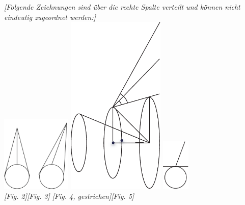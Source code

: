    \clearpage
   \pstart \noindent \textit{[Folgende Zeichnungen sind \"uber die rechte Spalte verteilt und k\"onnen nicht eindeutig zugeordnet werden:]}\\
   \includegraphics[width=0.25\textwidth]{images/35_15_6_65vfig1u2}
   \hspace{10mm}
   \includegraphics[width=0.35\textwidth]{images/35_15_6_65vfig3}
   \hspace{10mm}
   \includegraphics[width=0.1\textwidth]{images/35_15_6_65vfig4}
   \\
   \hspace{7mm} \textit{[Fig. 2]}\hspace{6mm}\textit{[Fig. 3]} \hspace{20mm}\textit{[Fig. 4, gestrichen]}\hspace{20mm}\textit{[Fig. 5]}\pend
   \vspace{5mm}
